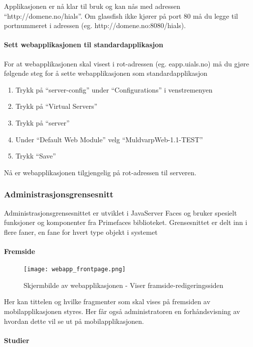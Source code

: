 \documentclass[../main.tex]{subfiles}
\begin{document}
Applikasjonen er nå klar til bruk og kan nås med adressen “http://domene.no/hials”. Om glassfish ikke kjører på port 80 må du legge til portnummeret i adressen (eg. http://domene.no:8080/hials).

\paragraph{Sett webapplikasjonen til standardapplikasjon}

For at webapplikasjonen skal visest i rot-adressen (eg. eapp.uials.no) må du gjøre følgende steg for å sette webapplikasjonen som standardapplikasjon

\begin{enumerate}
\item Trykk på “server-config” under “Configurations” i venstremenyen
\item Trykk på “Virtual Servers”
\item Trykk på “server”
\item Under “Default Web Module” velg “MuldvarpWeb-1.1-TEST”
\item Trykk “Save”
\end{enumerate}
Nå er webapplikasjonen tilgjengelig på rot-adressen til serveren.

\subsubsection{Administrasjonsgrensesnitt}

Administrasjonsgrensesnittet er utviklet i JavaServer Faces og bruker spesielt funksjoner og komponenter fra Primefaces biblioteket. Grensesnittet er delt inn i flere faner, en fane for hvert type objekt i systemet

\paragraph{Fremside}

\begin{figure}[H]
  \centering
  \texttt{[image: webapp\_frontpage.png]}
  \caption{Skjermbilde av webapplikasjonen - Viser framside-redigeringssiden}
\end{figure}

Her kan tittelen og hvilke fragmenter som skal vises på fremsiden av mobilapplikasjonen styres. Her får også administratoren en forhåndsvisning av hvordan dette vil se ut på mobilapplikasjonen.

\paragraph{Studier}
\end{document}
